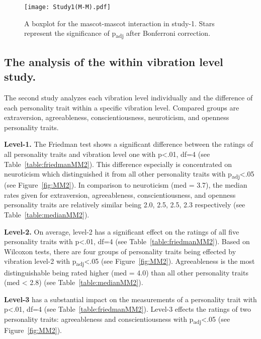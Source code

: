 \begin{figure}[hbt!]
    \centering
    \texttt{[image: Study1(M-M).pdf]}
    \caption[]{A boxplot for the mascot-mascot interaction in study-1.
    Stars represent the significance of p\textsubscript{adj} after Bonferroni correction.\footnotemark}
    \label{fig:MM1}
\end{figure}
\subsection{The analysis of the within vibration level study.}
\label{subsec:MMstudy2}
The second study analyzes each vibration level individually and the difference
of each personality trait within a specific vibration level.
Compared groups are extraversion, agreeableness, conscientiousness, neuroticism, and openness personality traits.

\par\textbf{Level-1.}
The Friedman test shows a significant difference between the ratings of all personality traits
and vibration level one with p<.01, df=4 (see Table~\ref{table:friedmanMM2}).
This difference especially is concentrated on neuroticism which distinguished it from all
other personality traits with p\textsubscript{adj}<.05 (see Figure~\ref{fig:MM2}).
In comparison to neuroticism (med = 3.7), the median rates given for extraversion,
agreeableness, conscientiousness, and openness personality traits are relatively similar
being 2.0, 2.5, 2.5, 2.3 respectively (see Table~\ref{table:medianMM2}).

\par\textbf{Level-2.}
On average, level-2 has a significant effect on the ratings of all five personality
traits with p<.01, df=4 (see Table~\ref{table:friedmanMM2}).
Based on Wilcoxon tests, there are four groups of personality traits being effected by
vibration level-2 with p\textsubscript{adj}<.05 (see Figure~\ref{fig:MM2}).
Agreeableness is the most distinguishable being rated higher (med = 4.0)
than all other personality traits (med < 2.8) (see Table~\ref{table:medianMM2}).

\par\textbf{Level-3}
has a substantial impact on the measurements of a personality trait
with p<.01, df=4 (see Table~\ref{table:friedmanMM2}).
Level-3 effects the ratings of two personality traits: agreeableness and
conscientiousness with p\textsubscript{adj}<.05 (see Figure~\ref{fig:MM2}).

